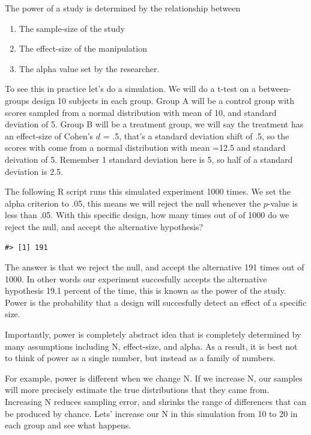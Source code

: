 \documentclass[
  letterpaper,
  DIV=11,
  numbers=noendperiod]{scrreprt}
\providecommand{\tightlist}{%
  \setlength{\itemsep}{0pt}\setlength{\parskip}{0pt}}\usepackage{longtable,booktabs,array}
\begin{document}
The power of a study is determined by the relationship between

\begin{enumerate}
\def\labelenumi{\arabic{enumi}.}
\tightlist
\item
  The sample-size of the study
\item
  The effect-size of the manipulation
\item
  The alpha value set by the researcher.
\end{enumerate}

To see this in practice let's do a simulation. We will do a t-test on a
between-groups design 10 subjects in each group. Group A will be a
control group with scores sampled from a normal distribution with mean
of 10, and standard deviation of 5. Group B will be a treatment group,
we will say the treatment has an effect-size of Cohen's \(d\) = .5,
that's a standard deviation shift of .5, so the scores with come from a
normal distribution with mean =12.5 and standard deivation of 5.
Remember 1 standard deviation here is 5, so half of a standard deviation
is 2.5.

The following R script runs this simulated experiment 1000 times. We set
the alpha criterion to .05, this means we will reject the null whenever
the \(p\)-value is less than .05. With this specific design, how many
times out of of 1000 do we reject the null, and accept the alternative
hypothesis?

\begin{verbatim}
#> [1] 191
\end{verbatim}

The answer is that we reject the null, and accept the alternative 191
times out of 1000. In other words our experiment succesfully accepts the
alternative hypothesis 19.1 percent of the time, this is known as the
power of the study. Power is the probability that a design will
succesfully detect an effect of a specific size.

Importantly, power is completely abstract idea that is completely
determined by many assumptions including N, effect-size, and alpha. As a
result, it is best not to think of power as a single number, but instead
as a family of numbers.

For example, power is different when we change N. If we increase N, our
samples will more precisely estimate the true distributions that they
came from. Increasing N reduces sampling error, and shrinks the range of
differences that can be produced by chance. Lets' increase our N in this
simulation from 10 to 20 in each group and see what happens.
\end{document}
